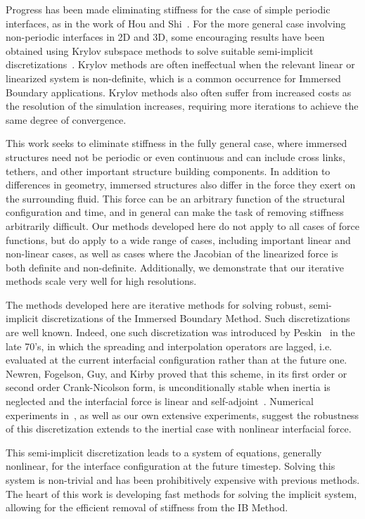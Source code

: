 Progress has been made eliminating stiffness for the case of simple periodic interfaces, as in the work of Hou and Shi~\cite{HS2008b,HS2008a}.
For the more general case involving non-periodic interfaces in 2D and 3D, some encouraging results have been obtained using Krylov subspace methods to solve suitable semi-implicit discretizations~\cite{MP93,MP2008,le2009implicit}. Krylov methods are often ineffectual when the relevant	 linear or linearized system is non-definite, which is a common occurrence for Immersed Boundary applications. Krylov methods also often suffer from increased costs as the resolution of the simulation increases, requiring more iterations to achieve the same degree of convergence.

This work seeks to eliminate stiffness in the fully general case, where immersed structures need not be periodic or even continuous and can include cross links, tethers, and other important structure building components. In addition to differences in geometry, immersed structures also differ in the force they exert on the surrounding fluid. This force can be an arbitrary function of the 	structural configuration and time, and in general can make the task of removing stiffness arbitrarily difficult. Our methods developed here do not apply to all cases of force functions, but do apply to a wide range of cases, including important linear and non-linear cases, as well as cases where the Jacobian of the linearized force is both definite and non-definite. Additionally, we demonstrate that our iterative methods scale very well for high resolutions.

The methods developed here are iterative methods for solving robust, semi-implicit discretizations of the Immersed Boundary Method. Such discretizations are well known. Indeed, one such discretization was introduced by Peskin~\cite{Peskin77} in the late 70's, in which
the spreading and interpolation operators are lagged, i.e. evaluated at the current interfacial configuration rather than at the future one. Newren, Fogelson, Guy, and Kirby
proved that this scheme, in its first order or second order Crank-Nicolson form, is unconditionally stable when inertia is neglected and the interfacial  force is linear and self-adjoint~\cite{NFGK2007}. Numerical experiments in~\cite{NFGK2007}, as well as our own extensive experiments, suggest the robustness of this discretization extends to the inertial case with nonlinear interfacial force.

This semi-implicit discretization leads to a system of equations, generally nonlinear,  for the interface configuration at the future timestep. Solving this system is non-trivial and has been prohibitively expensive with previous methods. The heart of this work is developing fast methods for solving the implicit system, allowing for the efficient removal of stiffness from the IB Method.

